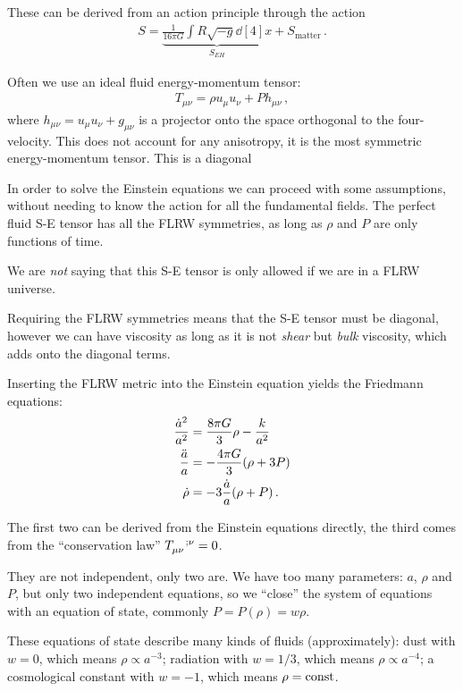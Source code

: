 \documentclass[main.tex]{subfiles}
\begin{document}
These can be derived from an action principle through the action 
%
\begin{align}
S = \underbrace{\frac{1}{16 \pi G} \int R \sqrt{-g} \dd[4]{x}}_{S_{EH}} + 
S_{\text{matter}}
\,.
\end{align}

Often we use an ideal fluid energy-momentum tensor: 
%
\begin{align}
T_{\mu \nu } = \rho u_{\mu } u_{\nu } + P h_{\mu \nu }
\,,
\end{align}
%
where \(h_{\mu \nu } = u_{\mu } u_{\nu } + g_{\mu \nu }\) is a projector onto the space orthogonal to the four-velocity. This does not account for any anisotropy, it is the most symmetric energy-momentum tensor. This is a diagonal 

In order to solve the Einstein equations we can proceed with some assumptions, without needing to know the action for all the fundamental fields. The perfect fluid S-E tensor has all the FLRW symmetries, as long as \(\rho \) and \(P\) are only functions of time. 

We are \emph{not} saying that this S-E tensor is only allowed if we are in a FLRW universe. 

Requiring the FLRW symmetries means that the S-E tensor must be diagonal, however we can have viscosity as long as it is not \emph{shear} but \emph{bulk} viscosity, which adds onto the diagonal terms.

Inserting the FLRW metric into the Einstein equation yields the Friedmann equations: 
%
\begin{align}
\frac{\dot{a}^2}{a^2} &= \frac{8\pi G}{3} \rho - \frac{k}{a^2}  \\
\frac{\ddot{a}}{a} &= - \frac{4 \pi G}{3} \qty(\rho + 3 P)  \\
\dot{\rho} &= - 3 \frac{\dot{a}}{a} \qty(\rho + P)
\,.
\end{align}

The first two can be derived from the Einstein equations directly, the third comes from the ``conservation law'' \(\tensor{T}{_{\mu \nu }^{;\nu }} = 0\). 

They are not independent, only two are.
We have too many parameters: \(a\), \(\rho \) and \(P\), but only two independent equations, so we ``close'' the system of equations with an equation of state, commonly \(P = P(\rho ) = w \rho \). 

These equations of state describe many kinds of fluids (approximately):
dust with \(w = 0\), which means \(\rho \propto a^{-3}\); radiation with \(w = 1/3\), which means \(\rho \propto a^{-4}\); a cosmological constant with \(w = -1\), which means \(\rho = \text{const}\).
\end{document}
